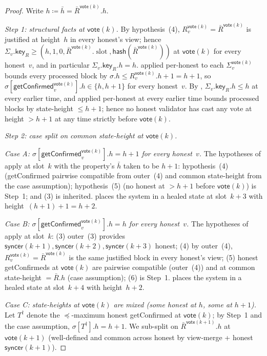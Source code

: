 \ifx\litemode\undefined\documentclass{article}\fi
\newcommand{\slot}[0]{\ensuremath{\operatorname{\mathrm{slot}}}}
\newcommand{\hash}{\mathsf{hash}}
\newcommand{\key}{\mathsf{key}}
\newcommand{\syncer}{\mathsf{syncer}}
\newcommand{\vote}{\mathsf{vote}}
\newcommand{\comm}[1]{\bar{#1}}
\newcommand{\getConfirmed}{\textsf{getConfirmed}\xspace}
\theoremstyle{plain}
\theoremstyle{definition}
\theoremstyle{remark}
\begin{document}
\begin{proof}
Write $h \coloneqq \comm{h} = \comm{R}^{\vote(k)}.h$.

\emph{Step 1: structural facts at $\vote(k)$.}
By hypothesis~(4), $R_v^{\vote(k)} = \comm{R}^{\vote(k)}$ is justified at height~$h$ in every honest's view; hence $\Sigma_v.\key_R \geq (h, 1, 0, \comm{R}^{\vote(k)}.\slot, \hash(\comm{R}^{\vote(k)}))$ at $\vote(k)$ for every honest~$v$, and in particular $\Sigma_v.\key_R.h = h$.  applied per-honest to each $\Sigma_v^{\vote(k)}$ bounds every processed block by $\sigma.h \leq R_v^{\vote(k)}.h + 1 = h + 1$, so $\sigma[\getConfirmed_v^{\vote(k)}].h \in \{h, h+1\}$ for every honest~$v$. By , $\Sigma_v.\key_R.h \leq h$ at every earlier time, and  applied per-honest at every earlier time bounds processed blocks by state-height $\leq h+1$; hence no honest validator has cast any vote at height $> h+1$ at any time strictly before $\vote(k)$.

\emph{Step 2: case split on common state-height at $\vote(k)$.}

\emph{Case A: $\sigma[\getConfirmed_v^{\vote(k)}].h = h+1$ for every honest~$v$.}
The hypotheses of  apply at slot~$k$ with the property's $\comm{h}$ taken to be $h+1$: hypothesis~(4) (\getConfirmed pairwise compatible from outer~(4) and common state-height from the case assumption); hypothesis~(5) (no honest at $> h+1$ before $\vote(k)$) is Step~1; and (3) is inherited.  places the system in a healed state at slot~$k+3$ with height~$(h+1)+1 = h+2$.

\emph{Case B: $\sigma[\getConfirmed_v^{\vote(k)}].h = h$ for every honest~$v$.}
The hypotheses of  apply at slot~$k$: (3) outer~(3) provides $\syncer(k+1), \syncer(k+2), \syncer(k+3)$ honest; (4) by outer~(4), $R_v^{\vote(k)} = \comm{R}^{\vote(k)}$ is the same justified block in every honest's view; (5) honest \getConfirmed{}s at $\vote(k)$ are pairwise compatible (outer~(4)) and at common state-height $= \comm{R}.h$ (case assumption); (6) is Step~1.  places the system in a healed state at slot~$k+4$ with height~$h+2$.

\emph{Case C: state-heights at $\vote(k)$ are mixed (some honest at $h$, some at $h+1$).}
Let $T^\dagger$ denote the $\preceq$-maximum honest \getConfirmed{} at $\vote(k)$; by Step~1 and the case assumption, $\sigma[T^\dagger].h = h+1$. We sub-split on $\comm{R}^{\vote(k+1)}.h$ at $\vote(k+1)$ (well-defined and common across honest by view-merge + honest $\syncer(k+1)$).


\end{proof}
\end{document}
